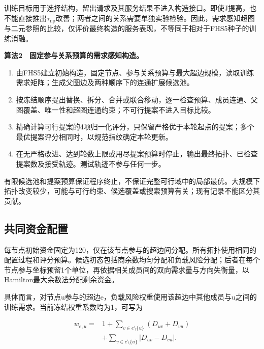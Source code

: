 \documentclass[UTF8,a4paper,twocolumn,fontset=none,zihao=5]{ctexart}
\newcommand{\algtitle}[1]{\par\Needspace{6\baselineskip}\smallskip\noindent\textbf{#1}\par\smallskip}
\begin{document}
训练目标用于选择结构，留出请求及其服务结果不进入构造接口。即使J提高，也不能直接推出$\tau_{\mathrm{np}}$改善；两者之间的关系需要单独实验检验。因此，需求感知超图与二元参照的比较，仅评价最终构造的服务表现，不等同于相对于FHS5种子的训练消融。


\algtitle{算法2　固定参与关系预算的需求感知构造。}\begin{enumerate}

\item 由FHS5建立初始构造，固定节点、参与关系预算与最大超边规模，读取训练需求矩阵；生成父图边及两种顺序下的连通扩展候选池。

\item 按冻结顺序提出替换、拆分、合并或联合移动，逐一检查预算、成员连通、父图覆盖、唯一性和超图连通约束；不可行提案不进入目标比较。

\item 精确计算可行提案的4项归一化评分，只保留严格优于本轮起点的提案；多个最优提案评分相同时，以规范指纹确定本轮更新。

\item 在无严格改进、达到轮数上限或用尽提案预算时停止，输出最终拓扑、已检查提案数及接受轨迹。测试轨迹不参与任何一步。

\end{enumerate}

有限候选池和提案预算保证程序终止，不保证完整可行域中的局部最优。大规模下拓扑改变较少，可能与可行约束、候选覆盖或搜索预算有关；现有记录不能区分其贡献。


\subsection{共同资金配置}

每节点初始资金固定为120，仅在该节点参与的超边间分配。所有拓扑使用相同的配置过程和评分预算。候选初态包括商余数均匀分配和负载风险分配；后者在每个节点参与坐标预留1个单位，再依据相关成员间的双向需求量与方向失衡量，以Hamilton最大余数法分配剩余资金。


具体而言，对节点u参与的超边e，负载风险权重使用该超边中其他成员与u之间的训练需求。当前冻结权重系数均为1，可写为



\begin{equation}
\begin{aligned}w_{e,u}={}&1+\sum_{v\in e\setminus\{u\}}(D_{uv}+D_{vu})\\&+\sum_{v\in e\setminus\{u\}}|D_{uv}-D_{vu}|.\end{aligned}
\label{eq:12}\end{equation}
\end{document}
